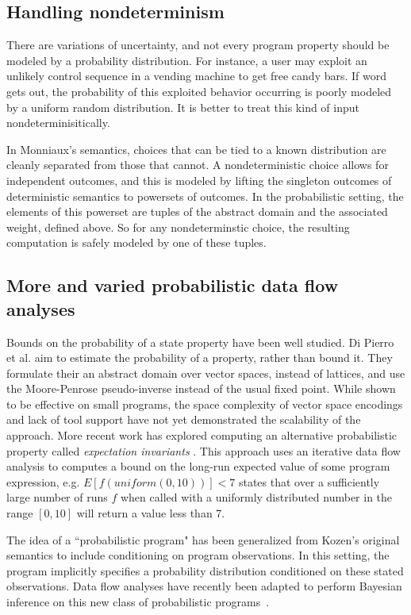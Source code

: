 \subsection{Handling nondeterminism}

There are variations of uncertainty,
and not every program property should be modeled by a
probability distribution.
For instance, a user may exploit an unlikely control sequence
in a vending machine to get free candy bars. 
If word gets out, the probability of
this exploited behavior occurring is poorly modeled by a uniform 
random distribution.
It is better to treat this kind of input nondeterminisitically.

In Monniaux's semantics, choices that can be tied to a known
distribution are cleanly separated from those that cannot.
A nondeterministic choice allows for independent outcomes, and
this is modeled by lifting the singleton outcomes of deterministic
semantics to powersets of outcomes.
In the probabilistic setting, the elements of this powerset are
tuples of the abstract domain and the associated weight, defined
above.
So for any nondeterminstic choice, the resulting computation 
is safely modeled by one of these tuples.

\subsection{More and varied probabilistic data flow analyses}

Bounds on the probability of a state property have been well studied.
Di Pierro et al. \cite{di2013probabilistic} aim to estimate the probability of a property,
rather than bound it.  They formulate their an abstract 
domain over vector spaces, instead of lattices, and use
the Moore-Penrose pseudo-inverse instead of the usual fixed point.
While shown to be effective on small programs, the space
complexity of vector space encodings and lack of tool support
have not yet demonstrated the scalability of the approach.
More recent work has explored computing an alternative probabilistic
property called {\sl expectation invariants} \cite{chakarov2014expectation}.
This approach uses an iterative data flow analysis to 
computes a bound on the long-run expected value of
some program expression, e.g. $E[f(uniform(0,10))] < 7$ states that
over a sufficiently large number of runs $f$ when called with
a uniformly distributed number in the range $[0,10]$ will return
a value less than 7.

The idea of a ``probabilistic program" has been generalized from
Kozen's original semantics to include conditioning on program
observations.
In this setting, the program implicitly specifies a probability 
distribution conditioned on these stated observations.
Data flow analyses have recently been adapted to perform Bayesian
inference on this new class of probabilistic 
programs~\cite{claret2013bayesian}.  
